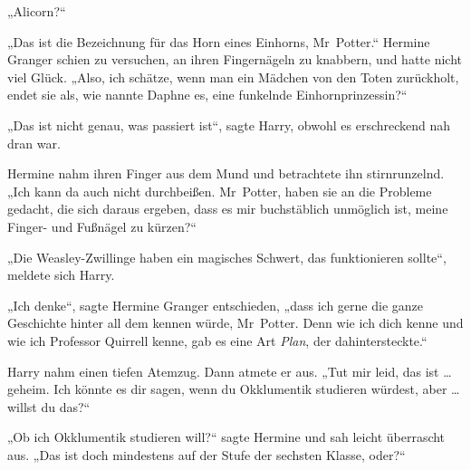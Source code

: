 „Alicorn?“

„Das ist die Bezeichnung für das Horn eines Einhorns, Mr~Potter.“
Hermine Granger schien zu versuchen, an ihren Fingernägeln zu knabbern, und hatte nicht viel Glück.
„Also, ich schätze, wenn man ein Mädchen von den Toten zurückholt, endet sie als, wie nannte Daphne es, eine funkelnde Einhornprinzessin?“

„Das ist nicht genau, was passiert ist“, sagte Harry, obwohl es erschreckend nah dran war.

Hermine nahm ihren Finger aus dem Mund und betrachtete ihn stirnrunzelnd.
„Ich kann da auch nicht durchbeißen. Mr~Potter, haben sie an die Probleme gedacht, die sich daraus ergeben, dass es mir buchstäblich unmöglich ist, meine Finger- und Fußnägel zu kürzen?“

„Die Weasley-Zwillinge haben ein magisches Schwert, das funktionieren sollte“, meldete sich Harry.

„Ich denke“, sagte Hermine Granger entschieden, „dass ich gerne die ganze Geschichte hinter all dem kennen würde, Mr~Potter. Denn wie ich dich kenne und wie ich Professor Quirrell kenne, gab es eine Art \emph{Plan}, der dahintersteckte.“

Harry nahm einen tiefen Atemzug. Dann atmete er aus.
„Tut mir leid, das ist … geheim. Ich könnte es dir sagen, wenn du Okklumentik studieren würdest, aber … willst du das?“

„Ob ich Okklumentik studieren will?“ sagte Hermine und sah leicht überrascht aus.
„Das ist doch mindestens auf der Stufe der sechsten Klasse, oder?“

